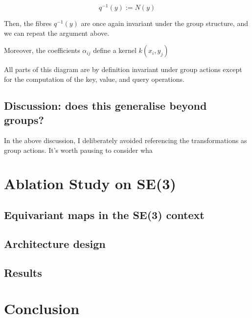 \documentclass[11pt]{article}
\begin{document}
$$ q^{-1}(y) := N(y)$$

Then, the fibres $q^{-1}(y)$ are once again invariant under the group structure, and we can repeat the argument above.

Moreover, the coefficients $\alpha_{ij}$ define a kernel $k(x_i, y_j)$

All parts of this diagram are by definition invariant under group actions except for the computation of the key, value, and query operations.  

\subsection*{Discussion: does this generalise beyond groups?}

In the above discussion, I deliberately avoided referencing the transformations as group actions. It's worth pausing to consider wha 




\section{Ablation Study on SE(3)}

\subsection*{Equivariant maps in the SE(3) context}

\subsection{Architecture design}

\subsection{Results}


\section{Conclusion}
\end{document}
